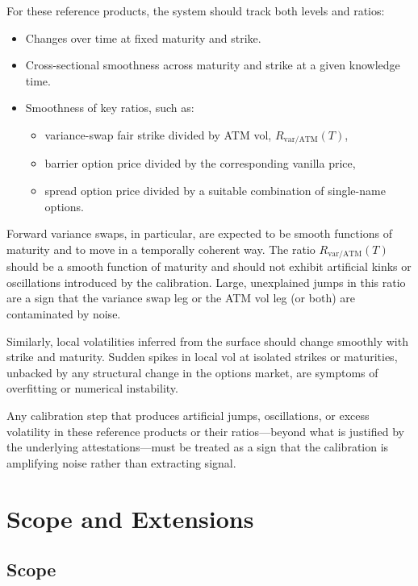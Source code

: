 \documentclass[11pt,a4paper]{article}
\begin{document}
For these reference products, the system should track both levels and ratios:
\begin{itemize}
    \item Changes over time at fixed maturity and strike.
    \item Cross-sectional smoothness across maturity and strike at a given knowledge time.
    \item Smoothness of key ratios, such as:
    \begin{itemize}
        \item variance-swap fair strike divided by ATM vol, $R_{\text{var/ATM}}(T)$,
        \item barrier option price divided by the corresponding vanilla price,
        \item spread option price divided by a suitable combination of single-name options.
    \end{itemize}
\end{itemize}

Forward variance swaps, in particular, are expected to be smooth functions of maturity and to move in a temporally coherent way. The ratio $R_{\text{var/ATM}}(T)$ should be a smooth function of maturity and should not exhibit artificial kinks or oscillations introduced by the calibration. Large, unexplained jumps in this ratio are a sign that the variance swap leg or the ATM vol leg (or both) are contaminated by noise.

Similarly, local volatilities inferred from the surface should change smoothly with strike and maturity. Sudden spikes in local vol at isolated strikes or maturities, unbacked by any structural change in the options market, are symptoms of overfitting or numerical instability.

Any calibration step that produces artificial jumps, oscillations, or excess volatility in these reference products or their ratios---beyond what is justified by the underlying attestations---must be treated as a sign that the calibration is amplifying noise rather than extracting signal.

\section{Scope and Extensions}

\subsection{Scope}
\end{document}
